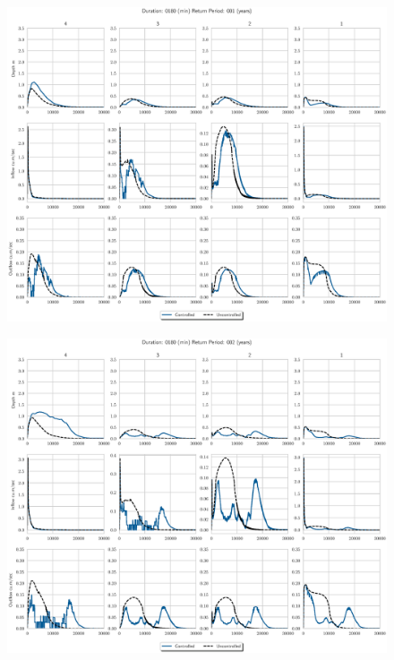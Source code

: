 \begin{figure}
    \centering
    \includegraphics[width=\linewidth]{./RL-SI-figures/77storms/0180001.eps}
\end{figure}
\begin{figure}
    \centering
    \includegraphics[width=\linewidth]{./RL-SI-figures/77storms/0180002.eps}
\end{figure}
